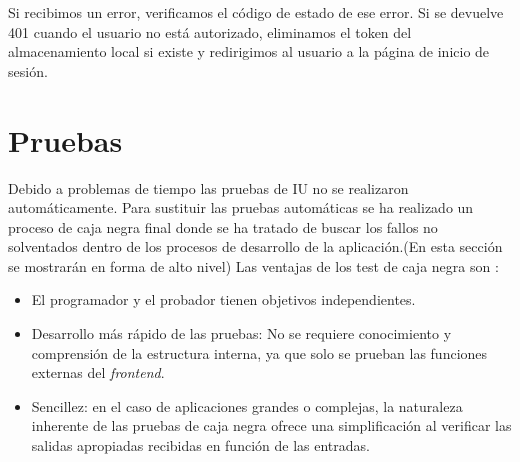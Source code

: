 Si recibimos un error, verificamos el código de estado de ese error. Si se devuelve 401 cuando el usuario no está autorizado, eliminamos el token del almacenamiento local si existe y redirigimos al usuario a la página de inicio de sesión.



\section{Pruebas}
Debido a problemas de tiempo las pruebas de IU no se realizaron automáticamente. Para sustituir las pruebas automáticas se ha realizado un proceso de caja negra final donde se ha tratado de buscar los fallos no solventados dentro de los procesos de desarrollo de la aplicación.(En esta sección se mostrarán en forma de alto nivel) Las ventajas de los test de caja negra son :

\begin{itemize}
\item El programador y el probador tienen objetivos independientes.
\item Desarrollo más rápido de las pruebas: No se requiere conocimiento y comprensión de la estructura interna, ya que solo se prueban las funciones externas del \textit{frontend}.
\item Sencillez: en el caso de aplicaciones grandes o complejas, la naturaleza inherente de las pruebas de caja negra ofrece una simplificación al verificar las salidas apropiadas recibidas en función de las entradas.
\end{itemize}

